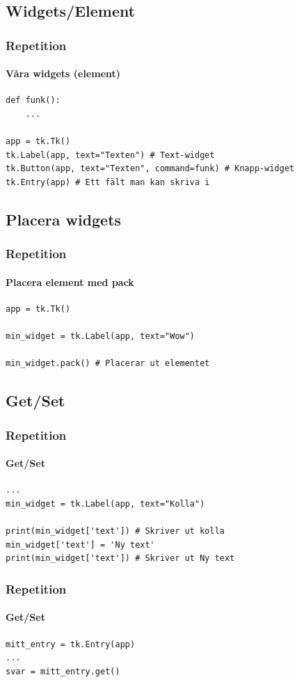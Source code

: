 \documentclass[aspectratio=169]{beamer}
\begin{document}
\subsection{Widgets/Element}

\begin{frame}[fragile]
	\frametitle{Repetition}
	\framesubtitle{Våra widgets (element)}
	
	\begin{lstlisting}
def funk():
    ...
	
app = tk.Tk()
tk.Label(app, text="Texten") # Text-widget
tk.Button(app, text="Texten", command=funk) # Knapp-widget
tk.Entry(app) # Ett fält man kan skriva i
	\end{lstlisting}

\end{frame}

\subsection{Placera widgets}

\begin{frame}[fragile]
	\frametitle{Repetition}
	\framesubtitle{Placera element med pack}
	
	\begin{lstlisting}
app = tk.Tk()

min_widget = tk.Label(app, text="Wow")

min_widget.pack() # Placerar ut elementet
	\end{lstlisting}

\end{frame}

\subsection{Get/Set}

\begin{frame}[fragile]
	\frametitle{Repetition}
	\framesubtitle{Get/Set}
	
	\begin{lstlisting}
...
min_widget = tk.Label(app, text="Kolla")

print(min_widget['text']) # Skriver ut kolla
min_widget['text'] = 'Ny text'
print(min_widget['text']) # Skriver ut Ny text
	\end{lstlisting}

\end{frame}

\begin{frame}[fragile]
	\frametitle{Repetition}
	\framesubtitle{Get/Set}
	
	\begin{lstlisting}
mitt_entry = tk.Entry(app)
...
svar = mitt_entry.get()
	\end{lstlisting}

\end{frame}
\end{document}
